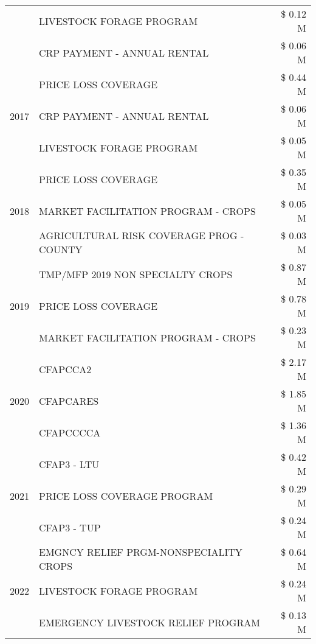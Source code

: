 \begin{tabular}{llr}
 & LIVESTOCK FORAGE PROGRAM & \$ 0.12 M \\
 & CRP PAYMENT - ANNUAL RENTAL & \$ 0.06 M \\
\cline{1-3}
\multirow[t]{3}{*}{2017} & PRICE LOSS COVERAGE & \$ 0.44 M \\
 & CRP PAYMENT - ANNUAL RENTAL & \$ 0.06 M \\
 & LIVESTOCK FORAGE PROGRAM & \$ 0.05 M \\
\cline{1-3}
\multirow[t]{3}{*}{2018} & PRICE LOSS COVERAGE & \$ 0.35 M \\
 & MARKET FACILITATION PROGRAM - CROPS & \$ 0.05 M \\
 & AGRICULTURAL RISK COVERAGE PROG - COUNTY & \$ 0.03 M \\
\cline{1-3}
\multirow[t]{3}{*}{2019} & TMP/MFP 2019 NON SPECIALTY CROPS & \$ 0.87 M \\
 & PRICE LOSS COVERAGE & \$ 0.78 M \\
 & MARKET FACILITATION PROGRAM - CROPS & \$ 0.23 M \\
\cline{1-3}
\multirow[t]{3}{*}{2020} & CFAPCCA2 & \$ 2.17 M \\
 & CFAPCARES & \$ 1.85 M \\
 & CFAPCCCCA & \$ 1.36 M \\
\cline{1-3}
\multirow[t]{3}{*}{2021} & CFAP3 - LTU & \$ 0.42 M \\
 & PRICE LOSS COVERAGE PROGRAM & \$ 0.29 M \\
 & CFAP3 - TUP & \$ 0.24 M \\
\cline{1-3}
\multirow[t]{3}{*}{2022} & EMGNCY RELIEF PRGM-NONSPECIALITY CROPS & \$ 0.64 M \\
 & LIVESTOCK FORAGE PROGRAM & \$ 0.24 M \\
 & EMERGENCY LIVESTOCK RELIEF PROGRAM & \$ 0.13 M \\
\cline{1-3}
\bottomrule
\end{tabular}
